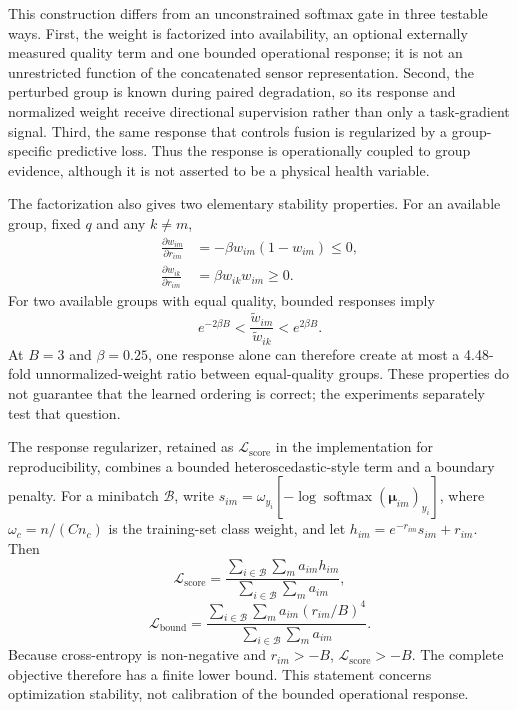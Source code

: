 \documentclass[11pt]{article}
\begin{document}
This construction differs from an unconstrained softmax gate in three testable ways. First, the weight is factorized into availability, an optional externally measured quality term and one bounded operational response; it is not an unrestricted function of the concatenated sensor representation. Second, the perturbed group is known during paired degradation, so its response and normalized weight receive directional supervision rather than only a task-gradient signal. Third, the same response that controls fusion is regularized by a group-specific predictive loss. Thus the response is operationally coupled to group evidence, although it is not asserted to be a physical health variable.

The factorization also gives two elementary stability properties. For an available group, fixed $q$ and any $k\ne m$,
\begin{equation}
\begin{aligned}
\frac{\partial w_{im}}{\partial r_{im}}&=-\beta w_{im}(1-w_{im})\leq0,\\
\frac{\partial w_{ik}}{\partial r_{im}}&=\beta w_{ik}w_{im}\geq0.
\end{aligned}
\label{eq:monotone}
\end{equation}
For two available groups with equal quality, bounded responses imply
\begin{equation}
e^{-2\beta B}<\frac{\widetilde w_{im}}{\widetilde w_{ik}}<e^{2\beta B}.
\label{eq:ratio}
\end{equation}
At $B=3$ and $\beta=0.25$, one response alone can therefore create at most a 4.48-fold unnormalized-weight ratio between equal-quality groups. These properties do not guarantee that the learned ordering is correct; the experiments separately test that question.

The response regularizer, retained as $\mathcal L_{\mathrm{score}}$ in the implementation for reproducibility, combines a bounded heteroscedastic-style term and a boundary penalty. For a minibatch $\mathcal B$, write $s_{im}=\omega_{y_i}[-\log\operatorname{softmax}(\boldsymbol{\mu}_{im})_{y_i}]$, where $\omega_c=n/(Cn_c)$ is the training-set class weight, and let $h_{im}=e^{-r_{im}}s_{im}+r_{im}$. Then
\begin{equation}
\mathcal L_{\mathrm{score}}=
\frac{\sum_{i\in\mathcal B}\sum_m a_{im}h_{im}}
{\sum_{i\in\mathcal B}\sum_m a_{im}},
\end{equation}
\begin{equation}
\mathcal L_{\mathrm{bound}}=
\frac{\sum_{i\in\mathcal B}\sum_m a_{im}(r_{im}/B)^4}
{\sum_{i\in\mathcal B}\sum_m a_{im}}.
\end{equation}
Because cross-entropy is non-negative and $r_{im}>-B$, $\mathcal L_{\mathrm{score}}>-B$. The complete objective therefore has a finite lower bound. This statement concerns optimization stability, not calibration of the bounded operational response.
\end{document}
